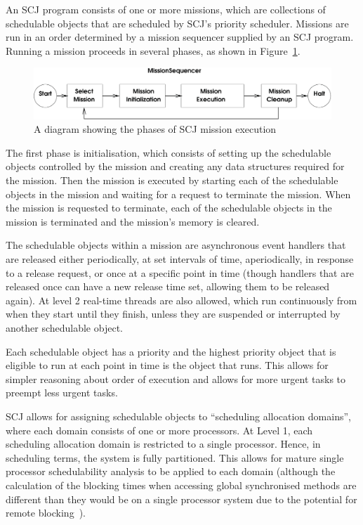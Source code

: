 An SCJ program consists of one or more missions, which are collections
of schedulable objects that are scheduled by SCJ's priority scheduler.
Missions are run in an order determined by a mission sequencer
supplied by an SCJ program.
Running a mission proceeds in several phases, as shown in
Figure~\ref{phases-diagram}.

\begin{figure}[ht]
  \includegraphics[width=\textwidth]{phases.pdf}
  \caption{A diagram showing the phases of SCJ mission execution}
  \label{phases-diagram}
\end{figure}

The first phase is initialisation, which consists of setting up the
schedulable objects controlled by the mission and creating any data
structures required for the mission.
Then the mission is executed by starting each of the schedulable
objects in the mission and waiting for a request to terminate the
mission.
When the mission is requested to terminate, each of the schedulable
objects in the mission is terminated and the mission's memory is
cleared.

The schedulable objects within a mission are asynchronous event
handlers that are released either periodically, at set intervals of
time, aperiodically, in response to a release request, or once at a
specific point in time (though handlers that are released once can
have a new release time set, allowing them to be released again).
At level 2 real-time threads are also allowed, which run continuously
from when they start until they finish, unless they are suspended or
interrupted by another schedulable object.

Each schedulable object has a priority and the highest priority object
that is eligible to run at each point in time is the object that runs.
This allows for simpler reasoning about order of execution and allows
for more urgent tasks to preempt less urgent tasks.

SCJ allows for assigning schedulable objects to ``scheduling
allocation domains'', where each domain consists of one or more
processors.
At Level 1, each scheduling allocation domain is restricted to a
single processor.
Hence, in scheduling terms, the system is fully partitioned.
This allows for mature single processor schedulability analysis to be
applied to each domain (although the calculation of the blocking times
when accessing global synchronised methods are different than they
would be on a single processor system due to the potential for remote
blocking~\cite{davis2011}).

